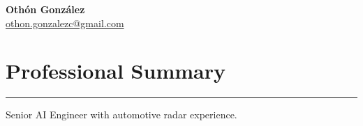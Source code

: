 \documentclass[11pt]{article}
\begin{document}
\begin{center}
{\Large \textbf{Oth\'on Gonz\'alez}}\\[4pt]
\href{mailto:othon.gonzalezc@gmail.com}{othon.gonzalezc@gmail.com} \\
\end{center}
\section*{Professional Summary}
\vspace{-10pt}
\noindent\rule{\textwidth}{0.4pt}
Senior AI Engineer with automotive radar experience.
\end{document}
